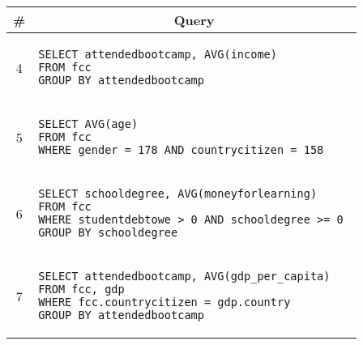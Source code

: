 \begin{tabular}{cl}
\toprule
\# & \multicolumn{1}{c}{Query} \\
\midrule
4 & 
\begin{minipage}{6in}
\begin{lstlisting}[breaklines]
SELECT attendedbootcamp, AVG(income) 
FROM fcc 
GROUP BY attendedbootcamp
\end{lstlisting}
\end{minipage}{queryno} \label{q4} \\
5 & 
\begin{minipage}{6in}
\begin{lstlisting}[breaklines]
SELECT AVG(age) 
FROM fcc 
WHERE gender = 178 AND countrycitizen = 158
\end{lstlisting}
\end{minipage}{queryno} \label{q5} \\
6 & 
\begin{minipage}{6in}
\begin{lstlisting}[breaklines]
SELECT schooldegree, AVG(moneyforlearning) 
FROM fcc 
WHERE studentdebtowe > 0 AND schooldegree >= 0 
GROUP BY schooldegree
\end{lstlisting}
\end{minipage}{queryno} \label{q6}\\
7 & 
\begin{minipage}{6in}
\begin{lstlisting}[breaklines]
SELECT attendedbootcamp, AVG(gdp_per_capita) 
FROM fcc, gdp 
WHERE fcc.countrycitizen = gdp.country 
GROUP BY attendedbootcamp
\end{lstlisting}
\end{minipage}{queryno} \label{q7}\\
\bottomrule
\end{tabular}
